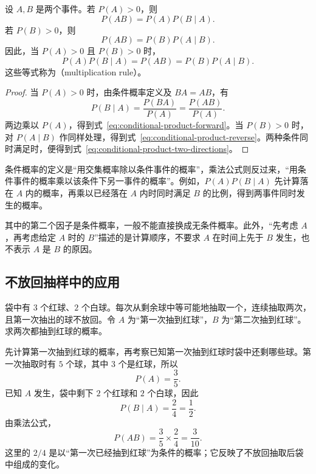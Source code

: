 \documentclass[UTF8]{ctexart}
\begin{document}
\begin{theorem}[乘法公式]
\label{thm:conditional-product-rule}
设 $A,B$ 是两个事件。若 $P(A)>0$，则
\begin{equation}
  P(AB)=P(A)P(B\mid A).
  \label{eq:conditional-product-forward}
\end{equation}
若 $P(B)>0$，则
\begin{equation}
  P(AB)=P(B)P(A\mid B).
  \label{eq:conditional-product-reverse}
\end{equation}
因此，当 $P(A)>0$ 且 $P(B)>0$ 时，
\begin{equation}
  P(A)P(B\mid A)=P(AB)=P(B)P(A\mid B).
  \label{eq:conditional-product-two-directions}
\end{equation}
这些等式称为（multiplication rule）。
\end{theorem}
\begin{proof}
当 $P(A)>0$ 时，由条件概率定义及 $BA=AB$，有
\[
  P(B\mid A)=\frac{P(BA)}{P(A)}=\frac{P(AB)}{P(A)}.
\]
两边乘以 $P(A)$，得到式~\eqref{eq:conditional-product-forward}。当 $P(B)>0$ 时，对 $P(A\mid B)$ 作同样处理，得到式~\eqref{eq:conditional-product-reverse}。两种条件同时满足时，便得到式~\eqref{eq:conditional-product-two-directions}。
\end{proof}

条件概率的定义是“用交集概率除以条件事件的概率”，乘法公式则反过来，“用条件事件的概率乘以该条件下另一事件的概率”。例如，$P(A)P(B\mid A)$ 先计算落在 $A$ 内的概率，再乘以已经落在 $A$ 内时同时满足 $B$ 的比例，得到两事件同时发生的概率。

其中的第二个因子是条件概率，一般不能直接换成无条件概率。此外，“先考虑 $A$，再考虑给定 $A$ 时的 $B$”描述的是计算顺序，不要求 $A$ 在时间上先于 $B$ 发生，也不表示 $A$ 是 $B$ 的原因。

\subsection{不放回抽样中的应用}

\begin{example}[连续两次抽到红球]
\label{ex:conditional-product-balls}
袋中有 $3$ 个红球、$2$ 个白球。每次从剩余球中等可能地抽取一个，连续抽取两次，且第一次抽出的球不放回。令 $A$ 为“第一次抽到红球”，$B$ 为“第二次抽到红球”。求两次都抽到红球的概率。
\end{example}
\begin{solve}
先计算第一次抽到红球的概率，再考察已知第一次抽到红球时袋中还剩哪些球。第一次抽取时有 $5$ 个球，其中 $3$ 个是红球，所以
\[
  P(A)=\frac35.
\]
已知 $A$ 发生，袋中剩下 $2$ 个红球和 $2$ 个白球，因此
\[
  P(B\mid A)=\frac24=\frac12.
\]
由乘法公式，
\begin{equation}
  P(AB)=\frac35\times\frac24=\frac3{10}.
  \label{eq:conditional-product-balls}
\end{equation}
这里的 $2/4$ 是以“第一次已经抽到红球”为条件的概率；它反映了不放回抽取后袋中组成的变化。
\end{solve}
\end{document}
